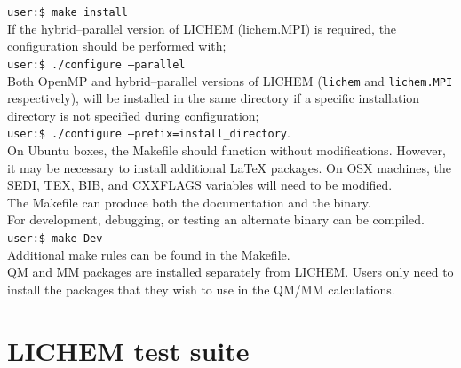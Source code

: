 \documentclass[12pt]{report}
\begin{document}
\texttt{user:\$ make install} \\

If the hybrid--parallel version of LICHEM (lichem.MPI) is required, 
the configuration should be performed with; \\

\texttt{user:\$ ./configure --parallel} \\

Both OpenMP and hybrid--parallel versions of LICHEM 
(\texttt{lichem} and \texttt{lichem.MPI} respectively), will be installed in the same
directory if a specific installation directory is not 
specified during configuration; \\ 

\texttt{user:\$ ./configure --prefix=install_directory}.\\




On Ubuntu boxes, the Makefile should function without modifications.
However, it may be necessary to install additional LaTeX packages.
On OSX machines, the SEDI, TEX, BIB, and CXXFLAGS variables will need to be
modified. \\

The Makefile can produce both the documentation and the binary. \\

For development, debugging, or testing an alternate binary can be compiled. \\

\texttt{user:\$ make Dev} \\

Additional make rules can be found in the Makefile. \\

QM and MM packages are installed separately from LICHEM.
Users only need to install the packages that they wish to use in the
QM/MM calculations.

\section{LICHEM test suite}
\end{document}
